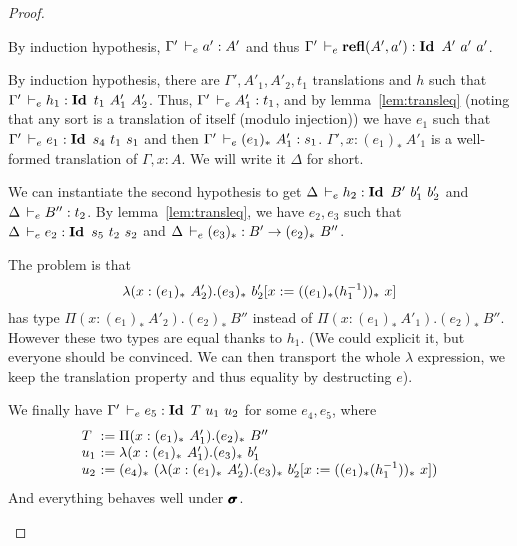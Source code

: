 \documentclass[a4paper,english]{lipics-utf8x}
\begin{document}
\begin{proof}
\begin{caselist}
      \begin{graycase}
        \begin{mathc}
        \end{mathc}
        By induction hypothesis, $\Gamma' \,\vdash_e a' : A'$ and thus
        $\Gamma' \,\vdash_e \operatorname{\mathbf{refl}}(A',a') : \operatorname{\mathbf{Id}~} A'\ a'\ a'$.
      \end{graycase}

      \nextcase
      \begin{mathc}
      \end{mathc}
      By induction hypothesis, there are $\Gamma',A'_1,A'_2,t_1$ translations
      and $h$ such that $\Gamma' \,\vdash_e h_1 : \operatorname{\mathbf{Id}~} t_1\ A'_1\ A'_2$.
      Thus, $\Gamma' \,\vdash_e A'_1 : t_1$, and by lemma~\ref{lem:transleq}
      (noting that any sort is a translation of itself (modulo injection))
      we have $e_1$ such that $\Gamma' \,\vdash_e e_1 : \operatorname{\mathbf{Id}~} s_4\ t_1\ s_1$ and
      then $\Gamma' \,\vdash_e (e_1)_*\ A'_1 : s_1$.
      $\Gamma', x : (e_1)_*\ A'_1$ is a well-formed translation of
      $\Gamma, x:A$. We will write it $\Delta$ for short.

      We can instantiate the second hypothesis to get
      $\Delta \,\vdash_e h_2 : \operatorname{\mathbf{Id}~} B'\ b'_1\ b'_2$ and $\Delta \,\vdash_e B'' : t_2$.
      By lemma~\ref{lem:transleq}, we have $e_2,e_3$ such that
      $\Delta \,\vdash_e e_2 : \operatorname{\mathbf{Id}~} s_5\ t_2\ s_2$ and
      $\Delta \,\vdash_e (e_3)_* : B' \to (e_2)_*\ B''$.

      The problem is that
      \[
        \lambda (x : (e_1)_*\ A'_2). (e_3)_*\ b'_2[x := ((e_1)_* (h_1^{-1}))_*\ x]
      \]
      has type
      $\Pi (x : (e_1)_*\ A'_2). (e_2)_*\ B''$ instead of
      $\Pi (x : (e_1)_*\ A'_1). (e_2)_*\ B''$.
      However these two types are equal thanks to $h_1$.
      (We could explicit it, but everyone should be convinced. We can then
      transport the whole $\lambda$ expression, we keep the translation
      property and thus equality by destructing $e$).

      We finally have
      $\Gamma' \,\vdash_e e_5 : \operatorname{\mathbf{Id}~} T\ u_1\ u_2$ for some $e_4,e_5$,
      where
      \[
        \begin{array}{l@{~}l}
          T   &:= \Pi (x : (e_1)_*\ A'_1). (e_2)_*\ B'' \\
          u_1 &:= \lambda (x : (e_1)_*\ A'_1). (e_3)_*\ b'_1 \\
          u_2 &:= (e_4)_*\ %
                   (\lambda (x : (e_1)_*\ A'_2).
                    (e_3)_*\ b'_2[x := ((e_1)_* (h_1\inv))_*\ x])
        \end{array}
      \]
      And everything behaves well under $\operatorname{\pmb{\bm{\sigma}}}$.


\end{caselist}
\end{proof}
\end{document}
